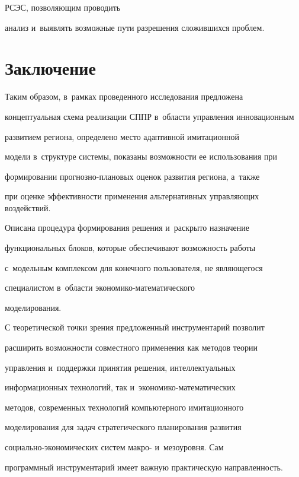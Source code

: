 РСЭС, поз\-во\-ля\-ющим проводить 


анализ и~выявлять возможные пути разрешения сложившихся проб\-лем.





\section{Заключение}





  Таким образом, в~рамках проведенного исследования предложена 


концептуальная схема реализации СППР в~об\-ласти управ\-ле\-ния инновационным 


развитием региона, определено место адаптивной имитационной 


модели в~структуре сис\-те\-мы, показаны возможности ее использования при 


формировании про\-гноз\-но-пла\-но\-вых оценок развития региона, а~также 


при оценке эффективности применения альтернативных управ\-ля\-ющих воздействий. 


Описана процедура формирования решения и~раскрыто назначение 


функциональных блоков, которые обеспечивают возможность работы 


с~модельным комплексом для конечного пользователя, не являющегося 


специалистом в~об\-ласти эко\-но\-ми\-ко-ма\-те\-ма\-ти\-че\-ско\-го 


моделирования.


%


   С теоретической точки зрения предложенный инструментарий позволит 


расширить возможности совместного применения как методов теории 


управ\-ле\-ния и~поддержки принятия решения, интеллектуальных 


информационных технологий, так и~эко\-но\-ми\-ко-ма\-те\-ма\-ти\-че\-ских 


методов, современных технологий компьютерного имитационного 


моделирования для задач стратегического планирования развития  


со\-ци\-аль\-но-эко\-но\-ми\-че\-ских систем макро- и~мезоуровня. Сам 


про\-граммный инструментарий имеет важную практическую на\-прав\-лен\-ность. 


